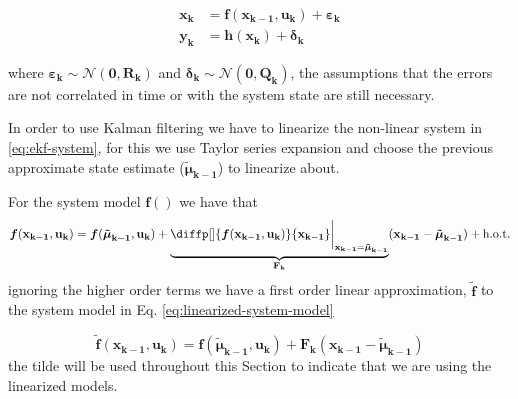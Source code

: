 \documentclass[12pt]{article}
\newcommand{\bvec}[1]{\mathbf{#1}} %
\newcommand{\mat}[1]{\mathbf{#1}}
\newcommand{\parentheses}[1]{\left(#1\right)}
\newcommand{\mb}[1]{{\boldsymbol{#1}}} %
\newcommand{\normal}[2]{\mathcal{N}\parentheses{#1, #2}}
\newcommand{\hot}{\text{h.o.t.}}
\begin{document}
\begin{equation}
\begin{aligned}
    \bvec{x_k} &= \mb{f}(\bvec{x_{k-1}, u_k}) + \mb{\varepsilon}_\mathbf{k} \\
    \bvec{y_k} &= \mb{h}(\bvec{x_{k}}) + \mb{\delta}_\mathbf{k}
\end{aligned}
    \label{eq:ekf-system}
\end{equation}

where $\mb{\varepsilon}_\mathbf{k} \sim \normal{\bvec{0}}{\bvec{R_k}}$ and $\mb{\delta}_\mathbf{k} \sim \normal{\bvec{0}}{\bvec{Q_k}}$, the assumptions that the errors are not correlated in time or with the system state are still necessary.

In order to use Kalman filtering we have to linearize the non-linear system in \ref{eq:ekf-system}, for this we use Taylor series expansion and choose the previous approximate state estimate ($\mb{\tilde{\mu}}_\mathbf{k-1}$) to linearize about.

For the system model $\mb{f}()$ we have that
\begin{equation*}
    \mb{f}(\bvec{x_{k-1}, u_k}) = \mb{f}(\mb{\tilde{\mu}}_\mathbf{k-1}, \bvec{u_k}) + \underbrace{\diffp[]{\mb{f}(\bvec{x_{k-1}, u_k}) }{\bvec{x_{k-1}}}\bigg\rvert_{\bvec{x_{k-1}} = \mb{\tilde{\mu}}_\mathbf{k-1}}}_{\mat{F_k}} (\bvec{x_{k-1}} - \mb{\tilde{\mu}}_\mathbf{k-1}) + \hot
\end{equation*}
ignoring the higher order terms we have a first order linear approximation, $\mb{\tilde{f}}$ to the system model in Eq. \ref{eq:linearized-system-model}

\begin{equation}
    \mb{\tilde{f}}(\bvec{x_{k-1}, u_k}) = \mb{f}(\mb{\tilde{\mu}}_\mathbf{k-1}, \bvec{u_k}) + \mat{F_k} (\bvec{x_{k-1}} - \mb{\tilde{\mu}}_\mathbf{k-1})
    \label{eq:linearized-system-model}
\end{equation}
the tilde will be used throughout this Section to indicate that we are using the linearized models.
\end{document}
